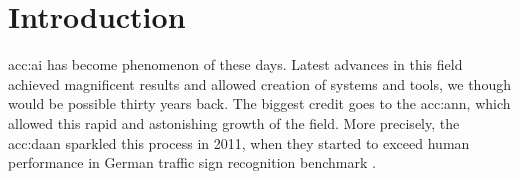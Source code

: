\chapter{Introduction}

\acrfull{acc:ai} has become phenomenon of these days. Latest advances in this field achieved magnificent results and allowed creation of systems and tools, we though would be possible thirty years back. The biggest credit goes to the \acrfull{acc:ann}, which allowed this rapid and astonishing growth of the field. More precisely, the \acrfull{acc:daan} sparkled this process in 2011, when they started to exceed human performance in German traffic sign recognition benchmark \cite{CIRESAN2012333}.